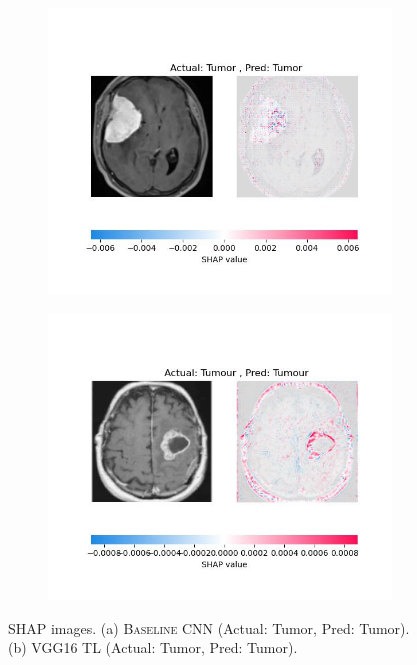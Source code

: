 \begin{figure}
\centering
\begin{subfigure}{0.5\linewidth}
  \centering
    \includegraphics[width=1\linewidth]{figures/baseline_cnn_correct_shap.jpeg}
    \caption{}
    \label{fig:baseline_cnn_correct_shap}
\end{subfigure}%
\begin{subfigure}{0.5\linewidth}
  \centering
    \includegraphics[width=1\linewidth]{figures/transfer_learning_correct_shap.jpeg}
    \caption{}
    \label{fig:transfer_learning_correct_shap}
\end{subfigure}
\caption{SHAP images. (a) \textsc{Baseline CNN} (Actual: Tumor, Pred: Tumor). (b) \textsc{VGG16 TL} (Actual: Tumor, Pred: Tumor).}
\label{fig:shap}
\end{figure}

